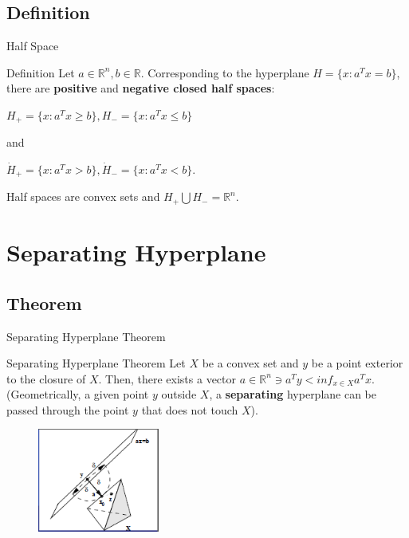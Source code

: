 \documentclass{beamer}
\begin{document}
\subsection{Definition}
\begin{frame}{Half Space}
\begin{block}{Definition}
Let $a \in \mathbb{R}^n, b \in \mathbb{R}$. Corresponding to the hyperplane $H = \lbrace x : a^T x = b \rbrace$, there are \textbf{positive} and \textbf{negative closed half spaces}:
\centerline{$H_+ = \lbrace x : a^T x \geq b \rbrace, H_- = \lbrace x : a^T x \leq b \rbrace$}
and
\centerline{$\dot{H}_+ = \lbrace x : a^T x > b \rbrace, \dot{H}_- = \lbrace x : a^T x < b \rbrace.$}
Half spaces are convex sets and $H_+ \bigcup H_- = \mathbb{R}^n.$
\end{block}
\end{frame}


\section{Separating Hyperplane}
\subsection{Theorem}
\begin{frame}{Separating Hyperplane Theorem}
\begin{block}{Separating Hyperplane Theorem}
Let $X$ be a convex set and $y$ be a point exterior to the closure of $X$. Then, there exists a vector $a \in \mathbb{R}^n \ni a^T y < inf_{x \in X} a^T x$. \\
(Geometrically, a given point $y$ outside $X$, a \textbf{separating} hyperplane can be passed through the point $y$ that does not touch $X$).
\end{block}
\begin{figure}[h]
\includegraphics[width=4cm]{picture1}
\end{figure}
\end{frame}
\end{document}
